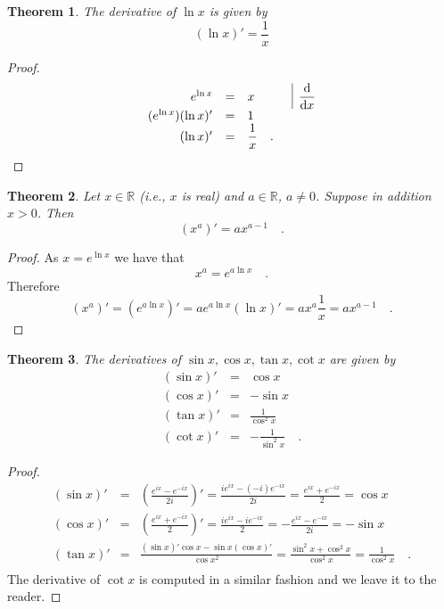 \documentclass[12pt]{book}
\newcommand{\importantFormula}[1]{\begin{equation} \boxed{#1} \end{equation}}
\newtheorem{theorem}{Theorem}[section]
\begin{document}
\begin{theorem}
The derivative of $\ln x$ is given by
\importantFormula{
(\ln x)' = \frac{1}x
}
\end{theorem}
\begin{proof}
\[
\begin{array}{rcll|l}
e^{\ln x}&=& x  &&\displaystyle  \frac {{\normalfont \text{d}}}{{\normalfont \text{d}} x}\\
(e^{\ln x})(\ln x)' &= &1\\
 (\ln x)' &=& \displaystyle \frac{1}x\quad .
\end{array}
\]
\end{proof}

\begin{theorem}
Let $x\in \mathbb R$ (i.e., $x$ is real) and $a\in \mathbb R$, $a\neq 0$. Suppose in addition $x>0$. Then
\begin{equation}\label{eqXtotheAthDerivative}
(x^a)'=ax^{a-1}\quad .
\end{equation}
\end{theorem}
\begin{proof} As $x=e^{\ln x}$ we have that
\[
x^a=  e^{a\ln x}\quad .
\]
Therefore
\[
(x^{a})'=(e^{a\ln x})'=ae^{a\ln x} (\ln x)' =a x^{a}\frac{1}{x} = ax^{a-1} \quad .
\]
\end{proof}
\begin{theorem}
The derivatives of $\sin x, \cos x, \tan x, \cot x$ are given by
\importantFormula{
\begin{array}{rcl}
(\sin x)'&=&\cos x\\
(\cos x)'&=&-\sin x\\
(\tan x)'&=&\frac{1}{\cos ^2 x}\\
(\cot x)'&=&-\frac{1}{\sin ^2 x}\quad .
\end{array}
}
\end{theorem}
\begin{proof}
\[
\begin{array}{rcl}
\displaystyle (\sin x)'&=&\displaystyle \left(\frac{ e^{ix}- e^{-ix}}{2i}\right)' =\frac{ie^{ix}- (-i)e^{-ix}}{2i} =\frac{e^{ix} +e^{-ix}}2=\cos x\\
\displaystyle(\cos x)' &=&\displaystyle \left(\frac{e^{ix} +e^{-ix}}{2}\right)' =\frac{ie^{ix}- ie^{-ix}}{2} = -\frac{e^{ix} -e^{-ix}}{2i}=-\sin x \\
\displaystyle (\tan x)' &=&\displaystyle  \frac{(\sin x)'\cos x- \sin x (\cos x)'}{ \cos x^{2}} = \frac{\sin^2x+ \cos^2x}{\cos^2x} =\frac{1}{\cos^2x} \quad .\\
\end{array}
\]
The derivative of $\cot x$ is computed in a similar fashion and we leave it to the reader.
\end{proof}
\end{document}
